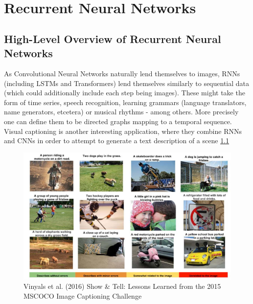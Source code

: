 \chapter{Recurrent Neural Networks}

\section{ High-Level Overview of Recurrent Neural Networks }

As Convolutional Neural Networks naturally lend themselves to images, RNNs (including LSTMs and Transformers) lend themselves similarly to sequential data (which could additionally include each step being images). These might take the form of time series, speech recognition, learning grammars (language translators, name generators, etcetera) or musical rhythms - among others. More precisely one can define them to be directed graphs mapping to a temporal sequence.\\

Visual captioning \cite{DBLP:journals/corr/VinyalsTBE16} is another interesting application, where they combine RNNs and CNNs in order to attempt to generate a text description of a scene \ref{fig:visual_caption}

\begin{figure}
    \centering
    \includegraphics[width=\textwidth]{figs/image_captioning.png}
    \caption{Vinyals et al. (2016) Show \& Tell: Lessons Learned from the 2015 MSCOCO Image Captioning Challenge}
    \label{fig:visual_caption}
\end{figure}

